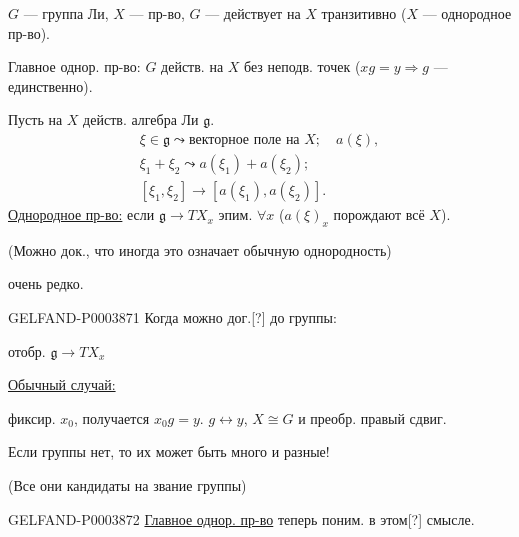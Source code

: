 $G$ --- группа Ли, $X$ --- пр-во, $G$ --- действует на $X$ транзитивно
($X$ --- однородное пр-во).

Главное однор. пр-во: $G$ действ. на $X$ без неподв. точек
($xg=y\Rightarrow g$ --- единственно).


Пусть на $X$ действ. алгебра Ли $\mathfrak{g}$.
\begin{gather*}
\xi\in\mathfrak{g}\leadsto\text{векторное поле на }X;\quad a(\xi),\\
\xi_1+\xi_2\leadsto a(\xi_1)+a(\xi_2);\\
[\xi_1,\xi_2]\longrightarrow[a(\xi_1),a(\xi_2)].
\end{gather*}
\underline{Однородное пр-во:} если $\mathfrak{g}\longrightarrow TX_x$ эпим. $\forall x$
($a(\xi)_x$ порождают всё $X$).

(Можно док., что иногда это означает обычную однородность)

очень редко.

\begin{GelfandAdjacentEvidence}{GELFAND-P000387}{1}
Когда можно дог.[?] до группы:
\end{GelfandAdjacentEvidence}



 отобр. $\mathfrak{g}\longrightarrow TX_x$

\underline{Обычный случай:}

фиксир. $x_0$, получается $x_0g=y$. $g\leftrightarrow y$, $X\cong G$
и преобр. правый сдвиг.

Если группы нет, то их может быть много и разные!

(Все они кандидаты на звание группы)

\begin{GelfandAdjacentEvidence}{GELFAND-P000387}{2}
\underline{Главное однор. пр-во} теперь поним. в этом[?] смысле.
\end{GelfandAdjacentEvidence}



